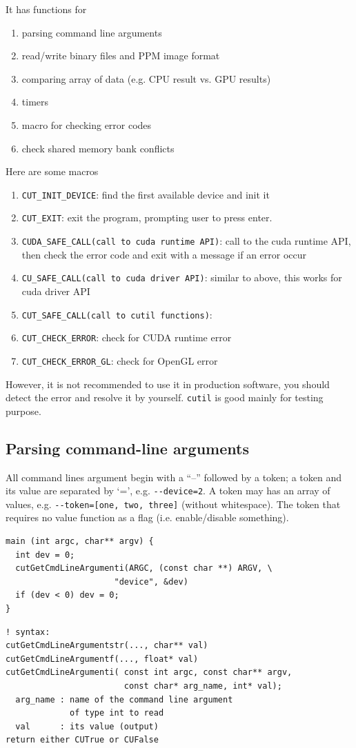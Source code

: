 It has functions for 
\begin{enumerate}
\item parsing command line arguments
\item read/write binary files and PPM image format
\item comparing array of data (e.g. CPU result vs. GPU results)
\item timers
\item macro for checking error codes
\item check shared memory bank conflicts
\end{enumerate}

Here are some macros
\begin{enumerate}
\item \verb!CUT_INIT_DEVICE!: find the first available device and init
  it
\item \verb!CUT_EXIT!: exit the program, prompting user to press
  enter.
\item \verb!CUDA_SAFE_CALL(call to cuda runtime API)!: call to the cuda
  runtime API, then check the error code and exit with a message if an
  error occur
\item \verb!CU_SAFE_CALL(call to cuda driver API)!: similar to above,
  this works for cuda driver API
\item \verb!CUT_SAFE_CALL(call to cutil functions)!:
\item \verb!CUT_CHECK_ERROR!: check for CUDA runtime error
\item \verb!CUT_CHECK_ERROR_GL!: check for OpenGL error
\end{enumerate}

However, it is not recommended to use it in production software, you
should detect the error and resolve it by yourself. \verb!cutil! is
good mainly for testing purpose.

\subsection{Parsing command-line arguments}
\label{sec:parsing-command-line}

All command lines argument begin with a ``--'' followed by a token; a
token and its value are separated by `=', e.g. \verb!--device=2!. A
token may has an array of values, e.g.
\verb!--token=[one, two, three]! (without whitespace).  The token that
requires no value function as a flag (i.e. enable/disable something).

\begin{lstlisting}
main (int argc, char** argv) {
  int dev = 0;
  cutGetCmdLineArgumenti(ARGC, (const char **) ARGV, \
                      "device", &dev)
  if (dev < 0) dev = 0;
}
\end{lstlisting}
\begin{lstlisting}
! syntax:
cutGetCmdLineArgumentstr(..., char** val)
cutGetCmdLineArgumentf(..., float* val)
cutGetCmdLineArgumenti( const int argc, const char** argv,  
                        const char* arg_name, int* val);
  arg_name : name of the command line argument 
             of type int to read
  val      : its value (output)
return either CUTrue or CUFalse
\end{lstlisting}

